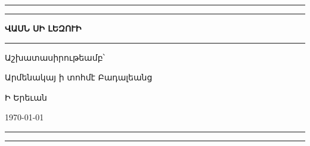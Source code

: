 
\begin{titlepage}
\begingroup
\newlength\drop{}\textheight

\setlength{\parindent}{0pt}

\rule{\textwidth}{1pt}\par
\vspace{2pt}\vspace{-\baselineskip}
\rule{\textwidth}{0.4pt}\par

\vspace\drop
\centering

{\fontsize{42}{42}\selectfont\textbf{ՎԱՍՆ ՍԻ ԼԵԶՈՒԻ}}
\null\vskip12pt\null

\vspace{0.25\drop}
\rule{0.3\textwidth}{0.4pt}\par
\vspace{\drop}

{\Large Աշխատասիրութեամբ՝}

\medskip
{\Large Արմենակայ ի տոհմէ Բադալեանց}

\vfill

{\large Ի Երեւան}

{\large\today}

\rule{\textwidth}{0.4pt}\par
\vspace{2pt}\vspace{-\baselineskip}
\rule{\textwidth}{1pt}\par

\endgroup

\end{titlepage}

\begin{titlepage}
\null
\end{titlepage}
